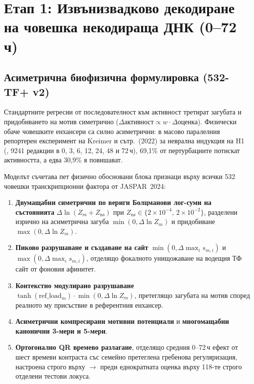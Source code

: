 \documentclass[10.5pt,a4paper]{article}
\begin{document}
\section{Етап 1: Извънизвадково декодиране на човешка некодираща ДНК (0--72\,ч)}

\subsection{Асиметрична биофизична формулировка (532-TF+ v2)}

Стандартните регресии от последователност към активност третират загубата и придобиването на мотив симетрично ($\Delta\text{активност} \propto w \cdot \Delta\text{оценка}$). Физически обаче човешките енхансери са силно асиметрични: в масово паралелния репортерен експеримент на Kreimer и сътр.\ (2022) за неврална индукция на H1 (, 9241 редакции в 0, 3, 6, 12, 24, 48 и 72\,ч), 69,1\% от пертурбациите потискат активността, а едва 30,9\% я повишават.

Моделът  съчетава пет физично обосновани блока признаци върху всички 532 човешки транскрипционни фактора от JASPAR~2024:
\begin{enumerate}
\item \textbf{Двумащабни симетрични по вериги Болцманови лог-суми на състоянията} $\Delta\ln(Z_m + Z_{\mathrm{ns}})$ при $Z_{\mathrm{ns}}\in\{2\times10^{-4},\, 2\times10^{-2}\}$, разделени изрично на асиметрична загуба $\min(0,\Delta\ln Z_m)$ и придобиване $\max(0,\Delta\ln Z_m)$.
\item \textbf{Пиково разрушаване и създаване на сайт} $\min(0,\Delta\max_i s_{m,i})$ и $\max(0,\Delta\max_i s_{m,i})$, отделящо фокалното унищожаване на водещия ТФ сайт от фоновия афинитет.
\item \textbf{Контекстно модулирано разрушаване} $\tanh(\text{ref\_load}_m)\cdot \min(0,\Delta\ln Z_m)$, претеглящо загубата на мотив според реалното му присъствие в референтния енхансер.
\item \textbf{Асиметрични компресирани мотивни потенциали} и \textbf{многомащабни канонични 3-мери и 5-мери}.
\item \textbf{Ортогонално QR времево разлагане}, отделящо средния 0--72\,ч ефект от шест времеви контраста със семейно претеглена гребенова регуляризация, настроена строго върху $\to$ преди еднократната оценка върху 118-те строго отделени тестови локуса.
\end{enumerate}
\end{document}
